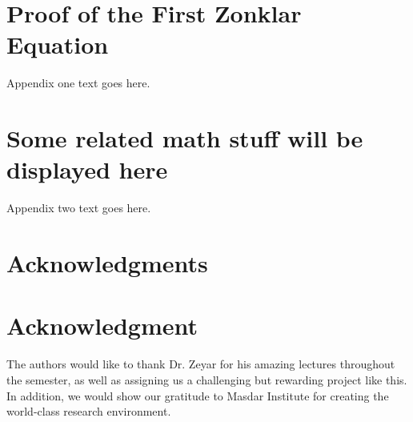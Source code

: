 \documentclass[12pt,journal,compsoc]{IEEEtran}
\begin{document}
%



\appendices
\section{Proof of the First Zonklar Equation}
Appendix one text goes here.

\section{Some related math stuff will be displayed here}
Appendix two text goes here.


\ifCLASSOPTIONcompsoc
  \section*{Acknowledgments}
\else
  \section*{Acknowledgment}
\fi


The authors would like to thank Dr. Zeyar for his amazing lectures throughout the semester, as well as assigning us a challenging but rewarding project like this. In addition, we would show our gratitude to Masdar Institute for creating the world-class research environment.


\ifCLASSOPTIONcaptionsoff
  \newpage
\fi
\end{document}
